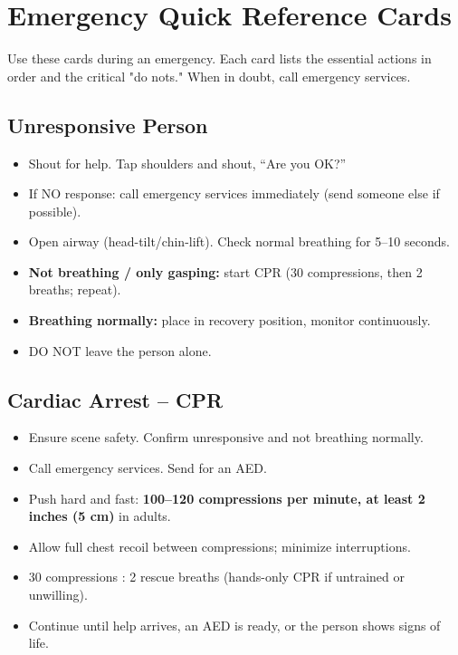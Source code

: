 \chapter{Emergency Quick Reference Cards}\label{ch:quickref}

Use these cards during an emergency. Each card lists the essential actions in order and the critical "do nots." When in doubt, call emergency services.

\section{Unresponsive Person}

\begin{itemize}[leftmargin=*]
\item Shout for help. Tap shoulders and shout, ``Are you OK?''
\item If NO response: call emergency services immediately (send someone else if possible).
\item Open airway (head-tilt/chin-lift). Check normal breathing for 5--10 seconds.
\item \textbf{Not breathing / only gasping:} start CPR (30 compressions, then 2 breaths; repeat).
\item \textbf{Breathing normally:} place in recovery position, monitor continuously.
\item DO NOT leave the person alone.
\end{itemize}

\section{Cardiac Arrest -- CPR}

\begin{itemize}[leftmargin=*]
\item Ensure scene safety. Confirm unresponsive and not breathing normally.
\item Call emergency services. Send for an AED.
\item Push hard and fast: \textbf{100--120 compressions per minute, at least 2 inches (5 cm)} in adults.
\item Allow full chest recoil between compressions; minimize interruptions.
\item 30 compressions : 2 rescue breaths (hands-only CPR if untrained or unwilling).
\item Continue until help arrives, an AED is ready, or the person shows signs of life.
\end{itemize}

